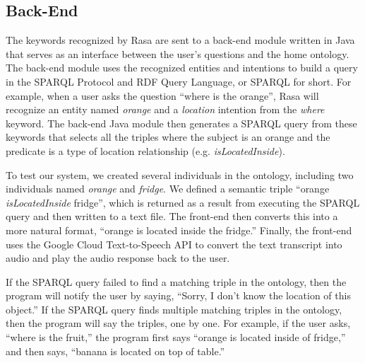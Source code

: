 \documentclass{article}
\begin{document}
\subsection{Back-End}
The keywords recognized by Rasa are sent to a back-end module written in Java 
that serves as an interface between the user's questions and the home 
ontology. The back-end module uses the recognized entities and intentions to 
build a query in the SPARQL Protocol and RDF Query Language, or SPARQL for 
short. For example, when a user asks the question ``where is the orange'', 
Rasa will recognize an entity named \textit{orange} and a \textit{location} 
intention from the \textit{where} keyword. The back-end Java module then generates a SPARQL query from these keywords that selects all the triples 
where the subject is an orange and the predicate is a type of location 
relationship (e.g. \textit{isLocatedInside}).

To test our system, we created several individuals in the ontology, 
including two individuals named \textit{orange} and \textit{fridge}.
We defined a semantic triple ``orange \textit{isLocatedInside} fridge'', 
which is returned as a result from executing the SPARQL query and then 
written to a text file. The front-end then converts this into a more natural 
format, ``orange is located inside the fridge.'' Finally, the front-end
uses the Google Cloud Text-to-Speech API to convert the text transcript into 
audio and play the audio response back to the user.

If the SPARQL query failed to find a matching triple in the ontology, then
the program will notify the user by saying, ``Sorry, I don't know the 
location of this object.'' If the SPARQL query finds multiple matching 
triples in the ontology, then the program will say the triples, one by one.
For example, if the user asks, ``where is the fruit,'' the program first says
``orange is located inside of fridge,'' and then says, 
``banana is located on top of table.''
\end{document}
